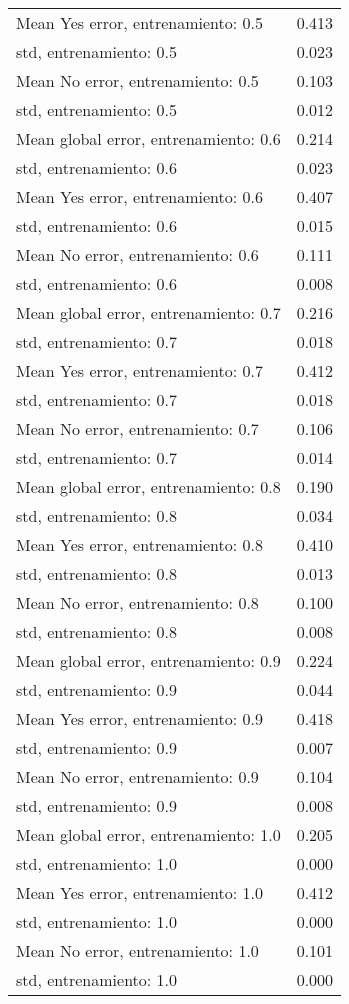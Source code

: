 \begin{longtable}{p{4cm}|p{1.5cm}}
Mean Yes error, entrenamiento: 0.5    & 0.413 \\
std, entrenamiento: 0.5               & 0.023 \\
Mean No error, entrenamiento: 0.5     & 0.103 \\
std, entrenamiento: 0.5               & 0.012 \\
Mean global error, entrenamiento: 0.6 & 0.214 \\
std, entrenamiento: 0.6               & 0.023 \\
Mean Yes error, entrenamiento: 0.6    & 0.407 \\
std, entrenamiento: 0.6               & 0.015 \\
Mean No error, entrenamiento: 0.6     & 0.111 \\
std, entrenamiento: 0.6               & 0.008 \\
Mean global error, entrenamiento: 0.7 & 0.216 \\
std, entrenamiento: 0.7               & 0.018 \\
Mean Yes error, entrenamiento: 0.7    & 0.412 \\
std, entrenamiento: 0.7               & 0.018 \\
Mean No error, entrenamiento: 0.7     & 0.106 \\
std, entrenamiento: 0.7               & 0.014 \\
Mean global error, entrenamiento: 0.8 & 0.190 \\
std, entrenamiento: 0.8               & 0.034 \\
Mean Yes error, entrenamiento: 0.8    & 0.410 \\
std, entrenamiento: 0.8               & 0.013 \\
Mean No error, entrenamiento: 0.8     & 0.100 \\
std, entrenamiento: 0.8               & 0.008 \\
Mean global error, entrenamiento: 0.9 & 0.224 \\
std, entrenamiento: 0.9               & 0.044 \\
Mean Yes error, entrenamiento: 0.9    & 0.418 \\
std, entrenamiento: 0.9               & 0.007 \\
Mean No error, entrenamiento: 0.9     & 0.104 \\
std, entrenamiento: 0.9               & 0.008 \\
Mean global error, entrenamiento: 1.0 & 0.205 \\
std, entrenamiento: 1.0               & 0.000 \\
Mean Yes error, entrenamiento: 1.0    & 0.412 \\
std, entrenamiento: 1.0               & 0.000 \\
Mean No error, entrenamiento: 1.0     & 0.101 \\
std, entrenamiento: 1.0               & 0.000 \\
\end{longtable}
